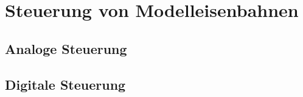 \section{Steuerung von Modelleisenbahnen}\label{text:Grundlagen:Steuerung-von-Modelleisenbahnen}

\subsection{Analoge Steuerung}\label{text:Grundlagen:Steuerung-von-Modelleisenbahnen:Analoge-Steuerung}

\subsection{Digitale Steuerung}\label{text:Grundlagen:Steuerung-von-Modelleisenbahnen:Digitale-Steuerung}
